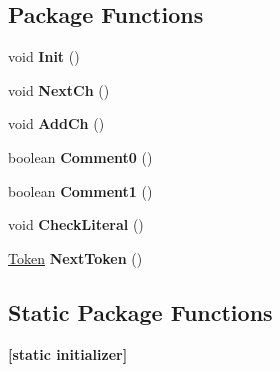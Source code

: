 \subsection*{Package Functions}
\begin{DoxyCompactItemize}
\item 
\hypertarget{classcompilationunit_1_1_scanner_a1100630a702dc9b900f44f1c35865c9f}{
void {\bfseries Init} ()}
\label{classcompilationunit_1_1_scanner_a1100630a702dc9b900f44f1c35865c9f}

\item 
\hypertarget{classcompilationunit_1_1_scanner_a0e2741d9cc66c3520e77624c352d9708}{
void {\bfseries NextCh} ()}
\label{classcompilationunit_1_1_scanner_a0e2741d9cc66c3520e77624c352d9708}

\item 
\hypertarget{classcompilationunit_1_1_scanner_a0eb372f8b5c663723eceb8dfb3cc05e7}{
void {\bfseries AddCh} ()}
\label{classcompilationunit_1_1_scanner_a0eb372f8b5c663723eceb8dfb3cc05e7}

\item 
\hypertarget{classcompilationunit_1_1_scanner_a67ef3c86cf56d9c5fe42c52f2f4cf7c0}{
boolean {\bfseries Comment0} ()}
\label{classcompilationunit_1_1_scanner_a67ef3c86cf56d9c5fe42c52f2f4cf7c0}

\item 
\hypertarget{classcompilationunit_1_1_scanner_ac18cf0476838ddc890802fd9a2556fc3}{
boolean {\bfseries Comment1} ()}
\label{classcompilationunit_1_1_scanner_ac18cf0476838ddc890802fd9a2556fc3}

\item 
\hypertarget{classcompilationunit_1_1_scanner_ade4fe8d65de183470cad490b2d37f73f}{
void {\bfseries CheckLiteral} ()}
\label{classcompilationunit_1_1_scanner_ade4fe8d65de183470cad490b2d37f73f}

\item 
\hypertarget{classcompilationunit_1_1_scanner_ae2e195a56186fa875374322287ea4beb}{
\hyperlink{classcompilationunit_1_1_token}{Token} {\bfseries NextToken} ()}
\label{classcompilationunit_1_1_scanner_ae2e195a56186fa875374322287ea4beb}

\end{DoxyCompactItemize}
\subsection*{Static Package Functions}
\begin{DoxyCompactItemize}
\item 
\hypertarget{classcompilationunit_1_1_scanner_a108da416c2b6aba54c0d778d32963ae7}{
{\bfseries \mbox{[}static initializer\mbox{]}}}
\label{classcompilationunit_1_1_scanner_a108da416c2b6aba54c0d778d32963ae7}

\end{DoxyCompactItemize}
